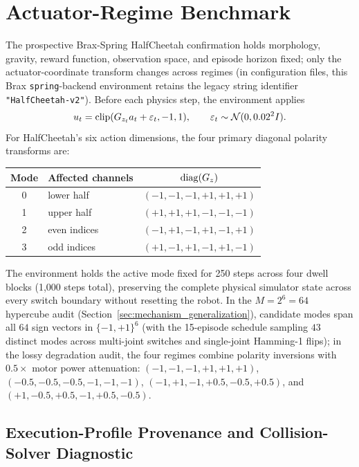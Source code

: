 \section{Actuator-Regime Benchmark}
\label{app:benchmark}

The prospective Brax-Spring HalfCheetah confirmation holds morphology, gravity, reward function, observation space, and episode horizon fixed; only the actuator-coordinate transform changes across regimes (in configuration files, this Brax \texttt{spring}-backend environment retains the legacy string identifier \texttt{"HalfCheetah-v2"}). Before each physics step, the environment applies
\begin{equation}
    u_t=\operatorname{clip}(G_{z_t}a_t+\varepsilon_t,-1,1),
    \qquad \varepsilon_t\sim\mathcal{N}(0,0.02^2 I).
\end{equation}
For HalfCheetah's six action dimensions, the four primary diagonal polarity transforms are:
\begin{center}
\begin{tabular}{clc}
\toprule
Mode & Affected channels & $\operatorname{diag}(G_z)$ \\
\midrule
0 & lower half & $(-1,-1,-1,+1,+1,+1)$ \\
1 & upper half & $(+1,+1,+1,-1,-1,-1)$ \\
2 & even indices & $(-1,+1,-1,+1,-1,+1)$ \\
3 & odd indices & $(+1,-1,+1,-1,+1,-1)$ \\
\bottomrule
\end{tabular}
\end{center}

The environment holds the active mode fixed for 250 steps across four dwell blocks (1,000 steps total), preserving the complete physical simulator state across every switch boundary without resetting the robot. In the $M=2^6=64$ hypercube audit (Section~\ref{sec:mechanism_generalization}), candidate modes span all $64$ sign vectors in $\{-1,+1\}^6$ (with the 15-episode schedule sampling $43$ distinct modes across multi-joint switches and single-joint Hamming-1 flips); in the lossy degradation audit, the four regimes combine polarity inversions with $0.5\times$ motor power attenuation: $(-1,-1,-1,+1,+1,+1)$, $(-0.5,-0.5,-0.5,-1,-1,-1)$, $(-1,+1,-1,+0.5,-0.5,+0.5)$, and $(+1,-0.5,+0.5,-1,+0.5,-0.5)$.

\subsection{Execution-Profile Provenance and Collision-Solver Diagnostic}
\label{app:source_diagnostic}


